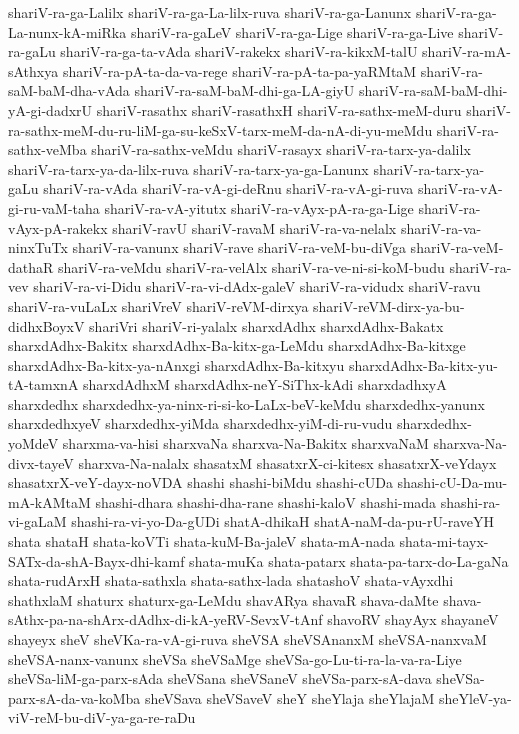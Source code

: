 {shariV-ra-ga-Lalilx
shariV-ra-ga-La-lilx-ruva
shariV-ra-ga-Lanunx
shariV-ra-ga-La-nunx-kA-miRka
shariV-ra-gaLeV
shariV-ra-ga-Lige
shariV-ra-ga-Live
shariV-ra-gaLu
shariV-ra-ga-ta-vAda
shariV-rakekx
shariV-ra-kikxM-talU
shariV-ra-mA-sAthxya
shariV-ra-pA-ta-da-va-rege
shariV-ra-pA-ta-pa-yaRMtaM
shariV-ra-saM-baM-dha-vAda
shariV-ra-saM-baM-dhi-ga-LA-giyU
shariV-ra-saM-baM-dhi-yA-gi-dadxrU
shariV-rasathx
shariV-rasathxH
shariV-ra-sathx-meM-duru
shariV-ra-sathx-meM-du-ru-liM-ga-su-keSxV-tarx-meM-da-nA-di-yu-meMdu
shariV-ra-sathx-veMba
shariV-ra-sathx-veMdu
shariV-rasayx
shariV-ra-tarx-ya-dalilx
shariV-ra-tarx-ya-da-lilx-ruva
shariV-ra-tarx-ya-ga-Lanunx
shariV-ra-tarx-ya-gaLu
shariV-ra-vAda
shariV-ra-vA-gi-deRnu
shariV-ra-vA-gi-ruva
shariV-ra-vA-gi-ru-vaM-taha
shariV-ra-vA-yitutx
shariV-ra-vAyx-pA-ra-ga-Lige
shariV-ra-vAyx-pA-rakekx
shariV-ravU
shariV-ravaM
shariV-ra-va-nelalx
shariV-ra-va-ninxTuTx
shariV-ra-vanunx
shariV-rave
shariV-ra-veM-bu-diVga
shariV-ra-veM-dathaR
shariV-ra-veMdu
shariV-ra-velAlx
shariV-ra-ve-ni-si-koM-budu
shariV-ra-vev
shariV-ra-vi-Didu
shariV-ra-vi-dAdx-galeV
shariV-ra-vidudx
shariV-ravu
shariV-ra-vuLaLx
shariVreV
shariV-reVM-dirxya
shariV-reVM-dirx-ya-bu-didhxBoyxV
shariVri
shariV-ri-yalalx
sharxdAdhx
sharxdAdhx-Bakatx
sharxdAdhx-Bakitx
sharxdAdhx-Ba-kitx-ga-LeMdu
sharxdAdhx-Ba-kitxge
sharxdAdhx-Ba-kitx-ya-nAnxgi
sharxdAdhx-Ba-kitxyu
sharxdAdhx-Ba-kitx-yu-tA-tamxnA
sharxdAdhxM
sharxdAdhx-neY-SiThx-kAdi
sharxdadhxyA
sharxdedhx
sharxdedhx-ya-ninx-ri-si-ko-LaLx-beV-keMdu
sharxdedhx-yanunx
sharxdedhxyeV
sharxdedhx-yiMda
sharxdedhx-yiM-di-ru-vudu
sharxdedhx-yoMdeV
sharxma-va-hisi
sharxvaNa
sharxva-Na-Bakitx
sharxvaNaM
sharxva-Na-divx-tayeV
sharxva-Na-nalalx
shasatxM
shasatxrX-ci-kitesx
shasatxrX-veYdayx
shasatxrX-veY-dayx-noVDA
shashi
shashi-biMdu
shashi-cUDa
shashi-cU-Da-mu-mA-kAMtaM
shashi-dhara
shashi-dha-rane
shashi-kaloV
shashi-mada
shashi-ra-vi-gaLaM
shashi-ra-vi-yo-Da-gUDi
shatA-dhikaH
shatA-naM-da-pu-rU-raveYH
shata
shataH
shata-koVTi
shata-kuM-Ba-jaleV
shata-mA-nada
shata-mi-tayx-SATx-da-shA-Bayx-dhi-kamf
shata-muKa
shata-patarx
shata-pa-tarx-do-La-gaNa
shata-rudArxH
shata-sathxla
shata-sathx-lada
shatashoV
shata-vAyxdhi
shathxlaM
shaturx
shaturx-ga-LeMdu
shavARya
shavaR
shava-daMte
shava-sAthx-pa-na-shArx-dAdhx-di-kA-yeRV-SevxV-tAnf
shavoRV
shayAyx
shayaneV
shayeyx
sheV
sheVKa-ra-vA-gi-ruva
sheVSA
sheVSAnanxM
sheVSA-nanxvaM
sheVSA-nanx-vanunx
sheVSa
sheVSaMge
sheVSa-go-Lu-ti-ra-la-va-ra-Liye
sheVSa-liM-ga-parx-sAda
sheVSana
sheVSaneV
sheVSa-parx-sA-dava
sheVSa-parx-sA-da-va-koMba
sheVSava
sheVSaveV
sheY
sheYlaja
sheYlajaM
sheYleV-ya-viV-reM-bu-diV-ya-ga-re-raDu
}

